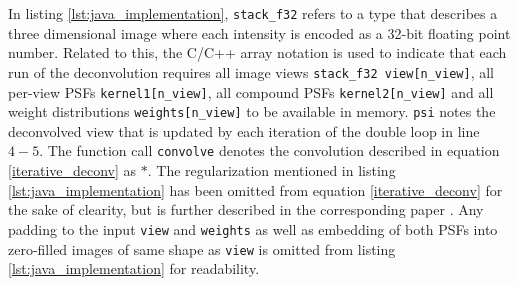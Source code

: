 In listing \ref{lst:java_implementation}, \texttt{stack\_f32} refers to a type that describes a three dimensional image where each intensity is encoded as a 32-bit floating point number. Related to this, the C/C++ array notation is used to indicate that each run of the deconvolution requires all image views \texttt{stack\_f32 view[n\_view]}, all per-view PSFs \texttt{kernel1[n\_view]}, all compound PSFs \texttt{kernel2[n\_view]} and all weight distributions \texttt{weights[n\_view]} to be available in memory. \texttt{psi} notes the deconvolved view that is updated by each iteration of the double loop in line $4-5$. The function call \texttt{convolve} denotes the convolution described in equation \ref{iterative_deconv} as $\ast$. The regularization mentioned in listing \ref{lst:java_implementation} has been omitted from equation \ref{iterative_deconv} for the sake of clearity, but is further described in the corresponding paper \cite{2013arXiv1308.0730P}. Any padding to the input \texttt{view} and \texttt{weights} as well as embedding of both PSFs into zero-filled images of same shape as \texttt{view} is omitted from listing \ref{lst:java_implementation} for readability. \newline



